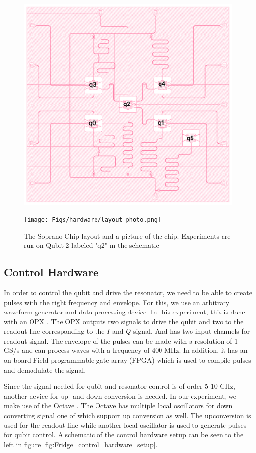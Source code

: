 \begin{figure}[h]
    \begin{minipage}{0.50\textwidth}
        \centering
        \includegraphics[height = 5 cm]{Figs/hardware/layout.png}
    \end{minipage}
        \begin{minipage}{0.50\textwidth}
        \centering
        \texttt{[image: Figs/hardware/layout\_photo.png]}
    \end{minipage}
    \caption{The Soprano Chip layout and a picture of the chip. Experiments are run on Qubit 2 labeled "q2" in the schematic.}
    \label{fig:soprano}
\end{figure}

\subsection{Control Hardware}
In order to control the qubit and drive the resonator, we need to be able to create pulses with the right frequency and envelope. For this, we use an arbitrary waveform generator and data processing device. In this experiment, this is done with an OPX \cite{noauthor_opx_nodate}. The OPX outputs two signals to drive the qubit and two to the readout line corresponding to the $I$ and $Q$ signal. And has two input channels for readout signal. The envelope of the pulses can be made with a resolution of 1 GS/s and can process waves with a frequency of 400 MHz. In addition, it has an on-board Field-programmable gate array (FPGA) which is used to compile pulses and demodulate the signal. 

Since the signal needed for qubit and resonator control is of order 5-10 GHz, another device for up- and down-conversion is needed. In our experiment, we make use of the Octave \cite{noauthor_octave_nodate}. The Octave has multiple local oscillators for down converting signal one of which support up conversion as well. The upconversion is used for the readout line while another local oscillator is used to generate pulses for qubit control. A schematic of the control hardware setup can be seen to the left in figure \ref{fig:Fridge_control_hardware_setup}.

